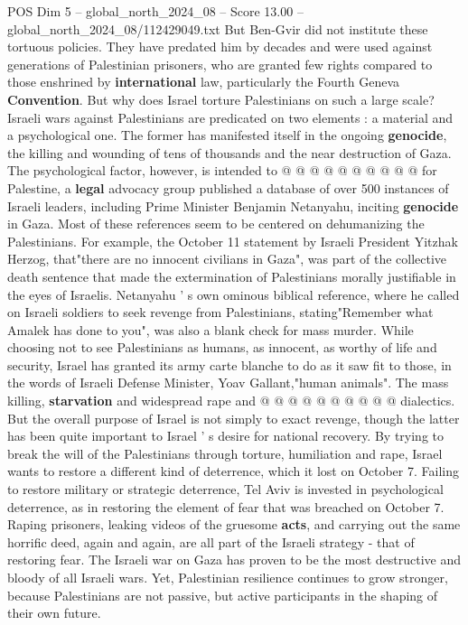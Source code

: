 \begin{textsample}{POS Dim 5 – global\_north\_2024\_08 – Score 13.00 – global\_north\_2024\_08/112429049.txt}
But Ben-Gvir did not institute these tortuous policies.
They have predated him by decades and were used against generations of Palestinian prisoners, who are granted few rights compared to those enshrined by \textbf{international} law, particularly the Fourth Geneva \textbf{Convention}.
But why does Israel torture Palestinians on such a large scale?
Israeli wars against Palestinians are predicated on two elements : a material and a psychological one.
The former has manifested itself in the ongoing \textbf{genocide}, the killing and wounding of tens of thousands and the near destruction of Gaza.
The psychological factor, however, is intended to @ @ @ @ @ @ @ @ @ @ for Palestine, a \textbf{legal} advocacy group published a database of over 500 instances of Israeli leaders, including Prime Minister Benjamin Netanyahu, inciting \textbf{genocide} in Gaza.
Most of these references seem to be centered on dehumanizing the Palestinians.
For example, the October 11 statement by Israeli President Yitzhak Herzog, that"there are no innocent civilians in Gaza", was part of the collective death sentence that made the extermination of Palestinians morally justifiable in the eyes of Israelis.
Netanyahu ' s own ominous biblical reference, where he called on Israeli soldiers to seek revenge from Palestinians, stating"Remember what Amalek has done to you", was also a blank check for mass murder.
While choosing not to see Palestinians as humans, as innocent, as worthy of life and security, Israel has granted its army carte blanche to do as it saw fit to those, in the words of Israeli Defense Minister, Yoav Gallant,"human animals".
The mass killing, \textbf{starvation} and widespread rape and @ @ @ @ @ @ @ @ @ @ dialectics.
But the overall purpose of Israel is not simply to exact revenge, though the latter has been quite important to Israel ' s desire for national recovery.
By trying to break the will of the Palestinians through torture, humiliation and rape, Israel wants to restore a different kind of deterrence, which it lost on October 7.
Failing to restore military or strategic deterrence, Tel Aviv is invested in psychological deterrence, as in restoring the element of fear that was breached on October 7.
Raping prisoners, leaking videos of the gruesome \textbf{acts}, and carrying out the same horrific deed, again and again, are all part of the Israeli strategy - that of restoring fear.
The Israeli war on Gaza has proven to be the most destructive and bloody of all Israeli wars.
Yet, Palestinian resilience continues to grow stronger, because Palestinians are not passive, but active participants in the shaping of their own future.

\end{textsample}
